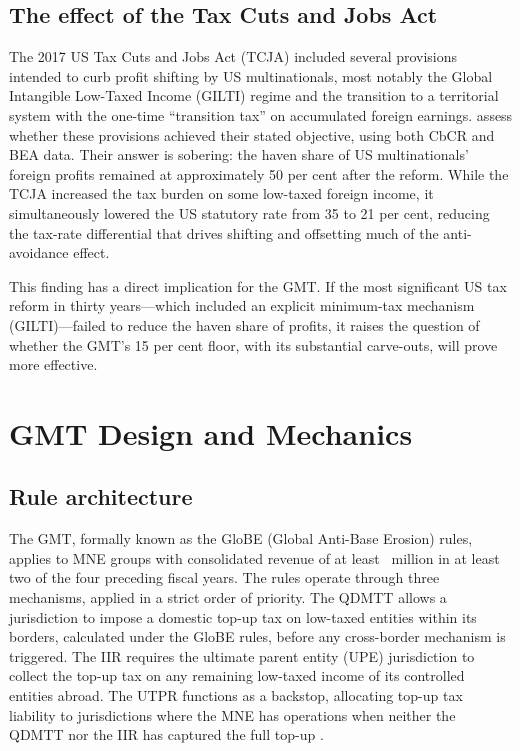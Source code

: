 \documentclass[12pt,a4paper]{article}
\begin{document}
\subsection{The effect of the Tax Cuts and Jobs Act}

The 2017 US Tax Cuts and Jobs Act (TCJA) included several provisions intended to curb profit shifting by US multinationals, most notably the Global Intangible Low-Taxed Income (GILTI) regime and the transition to a territorial system with the one-time ``transition tax'' on accumulated foreign earnings.
\textcite{garcia2022} assess whether these provisions achieved their stated objective, using both CbCR and BEA data.
Their answer is sobering: the haven share of US multinationals' foreign profits remained at approximately 50 per cent after the reform.
While the TCJA increased the tax burden on some low-taxed foreign income, it simultaneously lowered the US statutory rate from 35 to 21 per cent, reducing the tax-rate differential that drives shifting and offsetting much of the anti-avoidance effect.

This finding has a direct implication for the GMT.
If the most significant US tax reform in thirty years---which included an explicit minimum-tax mechanism (GILTI)---failed to reduce the haven share of profits, it raises the question of whether the GMT's 15 per cent floor, with its substantial carve-outs, will prove more effective.


\section{GMT Design and Mechanics}\label{sec:design}

\subsection{Rule architecture}

The GMT, formally known as the GloBE (Global Anti-Base Erosion) rules, applies to MNE groups with consolidated revenue of at least ~million in at least two of the four preceding fiscal years.
The rules operate through three mechanisms, applied in a strict order of priority.
The QDMTT allows a jurisdiction to impose a domestic top-up tax on low-taxed entities within its borders, calculated under the GloBE rules, before any cross-border mechanism is triggered.
The IIR requires the ultimate parent entity (UPE) jurisdiction to collect the top-up tax on any remaining low-taxed income of its controlled entities abroad.
The UTPR functions as a backstop, allocating top-up tax liability to jurisdictions where the MNE has operations when neither the QDMTT nor the IIR has captured the full top-up \parencite{bilicka2023}.
\end{document}
